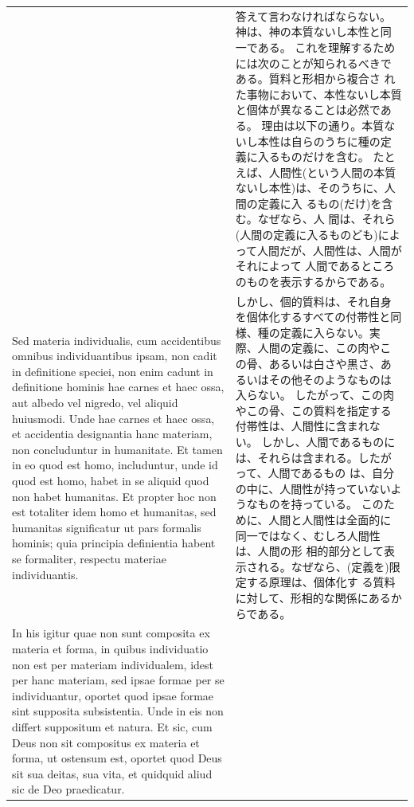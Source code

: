 \documentclass[paper=a4paper,fontsize=10pt,jafontsize=9pt,titlepage]{jlreq}
\begin{document}
\begin{longtable}{p{21em}p{21em}}
&

答えて言わなければならない。神は、神の本質ないし本性と同一である。
これを理解するためには次のことが知られるべきである。質料と形相から複合さ
 れた事物において、本性ないし本質と個体が異なることは必然である。
理由は以下の通り。本質ないし本性は自らのうちに種の定義に入るものだけを含む。
たと
 えば、人間性(という人間の本質ないし本性)は、そのうちに、人間の定義に入
 るもの(だけ)を含む。なぜなら、人
 間は、それら(人間の定義に入るものども)によって人間だが、人間性は、人間がそれによって
 人間であるところのものを表示するからである。



\\


Sed materia individualis, cum accidentibus omnibus individuantibus
 ipsam, non cadit in definitione speciei, non enim cadunt in definitione
 hominis hae carnes et haec ossa, aut albedo vel nigredo, vel aliquid
 huiusmodi.
Unde hae carnes et haec ossa, et accidentia designantia hanc materiam,
 non concluduntur in humanitate.
Et tamen in eo quod est homo, includuntur, unde id quod est homo, habet
 in se aliquid quod non habet humanitas.
Et propter hoc non est totaliter idem homo et humanitas, sed humanitas
 significatur ut pars formalis hominis; quia principia definientia
 habent se formaliter, respectu materiae individuantis.

&

しかし、個的質料は、それ自身を個体化するすべての付帯性と同様、種の定義に入らない。実際、人間の定義に、この肉やこの骨、あるいは白さや黒さ、あるいはその他そのようなものは入らない。
したがって、この肉やこの骨、この質料を指定する付帯性は、人間性に含まれない。
しかし、人間であるものには、それらは含まれる。したがって、人間であるもの
 は、自分の中に、人間性が持っていないようなものを持っている。
このために、人間と人間性は全面的に同一ではなく、むしろ人間性は、人間の形
 相的部分として表示される。なぜなら、(定義を)限定する原理は、個体化す
 る質料に対して、形相的な関係にあるからである。


\\


In his igitur quae non sunt composita ex materia et forma, in quibus
 individuatio non est per materiam individualem, idest per hanc
 materiam, sed ipsae formae per se individuantur, oportet quod ipsae
 formae sint supposita subsistentia.
Unde in eis non differt suppositum et natura.
Et sic, cum Deus non sit compositus ex materia et forma, ut ostensum
 est, oportet quod Deus sit sua deitas, sua vita, et quidquid aliud sic
 de Deo praedicatur.


\end{longtable}
\end{document}
